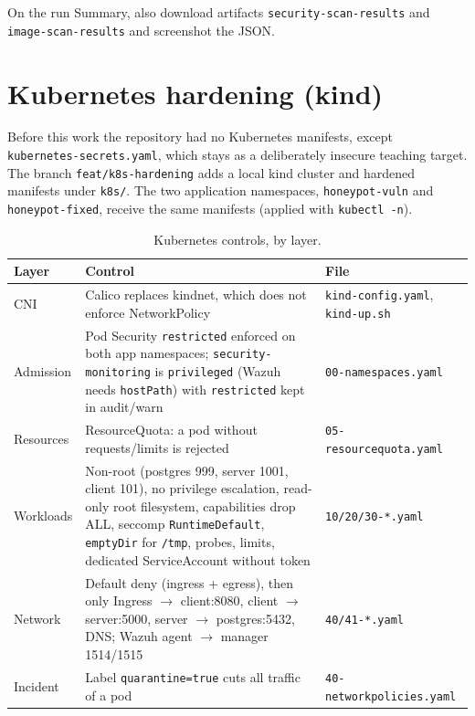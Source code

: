 \documentclass[11pt,a4paper]{article}
\newcommand{\thc}[1]{\textcolor{headtxt}{\textbf{#1}}}
\begin{document}
On the run Summary, also download artifacts \texttt{security-scan-results} and \texttt{image-scan-results} and screenshot the JSON.

\FloatBarrier
\section{Kubernetes hardening (kind)}
\label{sec:k8s}
Before this work the repository had no Kubernetes manifests, except \texttt{kubernetes-secrets.yaml}, which stays as a deliberately insecure teaching target.
The branch \texttt{feat/k8s-hardening} adds a local kind cluster and hardened manifests under \texttt{k8s/}.
The two application namespaces, \texttt{honeypot-vuln} and \texttt{honeypot-fixed}, receive the same manifests (applied with \texttt{kubectl -n}).

\begin{table}[H]
\centering
\caption{Kubernetes controls, by layer.}
\label{tab:k8s}
\begin{tabularx}{\textwidth}{@{}l Y l@{}}
\toprule
{}\thc{Layer} & \thc{Control} & \thc{File} \\
\midrule
CNI & Calico replaces kindnet, which does not enforce NetworkPolicy & \texttt{kind-config.yaml}, \texttt{kind-up.sh} \\
Admission & Pod Security \texttt{restricted} enforced on both app namespaces; \texttt{security-monitoring} is \texttt{privileged} (Wazuh needs \texttt{hostPath}) with \texttt{restricted} kept in audit/warn & \texttt{00-namespaces.yaml} \\
Resources & ResourceQuota: a pod without requests/limits is rejected & \texttt{05-resourcequota.yaml} \\
Workloads & Non-root (postgres 999, server 1001, client 101), no privilege escalation, read-only root filesystem, capabilities drop ALL, seccomp \texttt{RuntimeDefault}, \texttt{emptyDir} for \texttt{/tmp}, probes, limits, dedicated ServiceAccount without token & \texttt{10/20/30-*.yaml} \\
Network & Default deny (ingress + egress), then only Ingress $\rightarrow$ client:8080, client $\rightarrow$ server:5000, server $\rightarrow$ postgres:5432, DNS; Wazuh agent $\rightarrow$ manager 1514/1515 & \texttt{40/41-*.yaml} \\
Incident & Label \texttt{quarantine=true} cuts all traffic of a pod & \texttt{40-networkpolicies.yaml} \\
\bottomrule
\end{tabularx}
\end{table}
\end{document}
